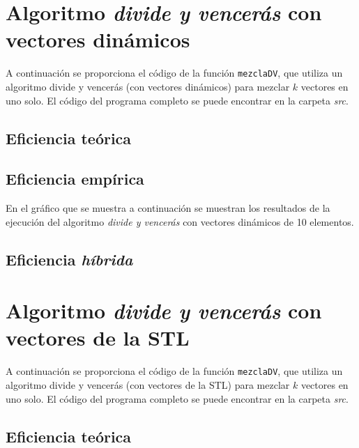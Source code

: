 \documentclass[11pt]{article}
\begin{document}
\section*{Algoritmo \textit{divide y vencerás} con vectores dinámicos}

A continuación se proporciona el código de la función \texttt{mezclaDV},
que utiliza un algoritmo divide y vencerás (con vectores dinámicos) para mezclar $k$ vectores en uno solo. El
código del programa completo se puede encontrar en la carpeta \textit{src}.\\



\subsection*{Eficiencia teórica}

\subsection*{Eficiencia empírica}

En el gráfico que se muestra a continuación se muestran los resultados de la
ejecución del algoritmo \textit{divide y vencerás} con vectores dinámicos de 10 elementos.

\begin{center}
	
\end{center}

\subsection*{Eficiencia \textit{híbrida}}

\section*{Algoritmo \textit{divide y vencerás} con vectores de la STL}


A continuación se proporciona el código de la función \texttt{mezclaDV},
que utiliza un algoritmo divide y vencerás (con vectores de la STL) para mezclar $k$ vectores en uno solo. El
código del programa completo se puede encontrar en la carpeta \textit{src}.



\subsection*{Eficiencia teórica}
\end{document}
